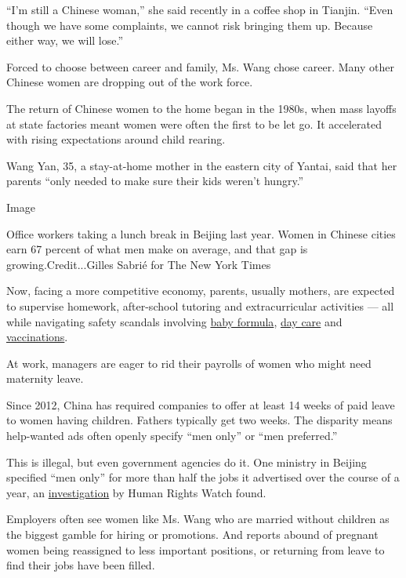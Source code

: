 ``I'm still a Chinese woman,'' she said recently in a coffee shop in
Tianjin. ``Even though we have some complaints, we cannot risk bringing
them up. Because either way, we will lose.''

Forced to choose between career and family, Ms. Wang chose career. Many
other Chinese women are dropping out of the work force.

The return of Chinese women to the home began in the 1980s, when mass
layoffs at state factories meant women were often the first to be let
go. It accelerated with rising expectations around child rearing.

Wang Yan, 35, a stay-at-home mother in the eastern city of Yantai, said
that her parents ``only needed to make sure their kids weren't hungry.''

Image

Office workers taking a lunch break in Beijing last year. Women in
Chinese cities earn 67 percent of what men make on average, and that gap
is growing.Credit...Gilles Sabrié for The New York Times

Now, facing a more competitive economy, parents, usually mothers, are
expected to supervise homework, after-school tutoring and
extracurricular activities --- all while navigating safety scandals
involving
\href{https://www.nytimes3xbfgragh.onion/2013/07/26/world/asia/chinas-search-for-infant-formula-goes-global.html}{baby
formula},
\href{https://www.nytimes3xbfgragh.onion/2017/11/24/world/asia/beijing-kindergarten-abuse.html}{day
care} and
\href{https://www.nytimes3xbfgragh.onion/2018/07/23/world/asia/china-vaccines-scandal-investigation.html}{vaccinations}.

At work, managers are eager to rid their payrolls of women who might
need maternity leave.

Since 2012, China has required companies to offer at least 14 weeks of
paid leave to women having children. Fathers typically get two weeks.
The disparity means help-wanted ads often openly specify ``men only'' or
``men preferred.''

This is illegal, but even government agencies do it. One ministry in
Beijing specified ``men only'' for more than half the jobs it advertised
over the course of a year, an
\href{https://www.hrw.org/report/2018/04/23/only-men-need-apply/gender-discrimination-job-advertisements-china}{investigation}
by Human Rights Watch found.

Employers often see women like Ms. Wang who are married without children
as the biggest gamble for hiring or promotions. And reports abound of
pregnant women being reassigned to less important positions, or
returning from leave to find their jobs have been filled.

